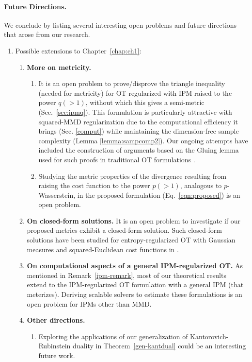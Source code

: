 \paragraph{Future Directions.} We conclude by listing several interesting open problems and future directions that arose from our research.
\begin{enumerate}
\item{Possible extensions to Chapter~\ref{chap:ch1}:}
    \begin{enumerate}
        \item \textbf{More on metricity.} 
        \begin{enumerate}\label{metricityopen}
            \item It is an open problem to prove/disprove the triangle inequality (needed for metricity) for OT regularized with IPM raised to the power $q(>1)$, without which this gives a semi-metric (Sec.~\ref{sec:ipmq}). This formulation is particularly attractive with squared-MMD regularization due to the computational efficiency it brings (Sec. \ref{comput}) while maintaining the dimension-free sample complexity (Lemma \ref{lemma:sampcomp2}). Our ongoing attempts have included the construction of arguments based on the Gluing lemma used for such proofs in traditional OT formulations \citep{villanioldnew,cuturi13a,Piccoli2014GeneralizedWD}.\label{mmd2OTproof}
            \item Studying the metric properties of the divergence resulting from raising the cost function to the power $p(>1)$, analogous to $p$-Wasserstein, in the proposed formulation (Eq.~\ref{eqn:proposed}) is an open problem.
        \end{enumerate}
        \item \textbf{On closed-form solutions.} It is an open problem to investigate if our proposed metrics exhibit a closed-form solution. Such closed-form solutions have been studied for entropy-regularized OT with Gaussian measures and squared-Euclidean cost functions in \cite{JanatiMPC20}.
        \item \textbf{On computational aspects of a general IPM-regularized OT.} As mentioned in Remark~\ref{ipm-remark}, most of our theoretical results extend to the IPM-regularized OT formulation with a general IPM (that meterizes). Deriving scalable solvers to estimate these formulations is an open problem for IPMs other than MMD.
        \item \textbf{Other directions.} 
        \begin{enumerate}
            \item Exploring the applications of our generalization of Kantorovich-Rubinstein duality in Theorem~\ref{gen-kantdual} could be an interesting future work.

\end{enumerate}
\end{enumerate}
\end{enumerate}
